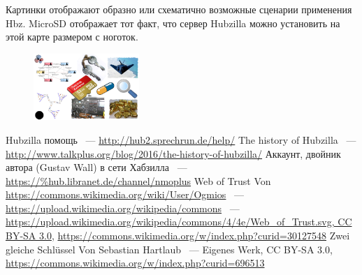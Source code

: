 \documentclass[10pt, a5paper]{article}
\begin{document}
Картинки отображают образно или схематично возможные сценарии применения Hbz. MicroSD отображает тот факт, что сервер Hubzilla можно установить на этой карте размером с ноготок.

\begin{center}
\begin{figure}[h!]
  \centering
  \includegraphics[width=4cm]{Wall2.png}
  
  \label{Wall2}
\end{figure}
\end{center} 

\begin{thebibliography}{20}
 Hubzilla помощь ~--- \url{http://hub2.sprechrun.de/help/}
 The history of Hubzilla ~--- \url{http://www.talkplus.org/blog/2016/the-history-of-hubzilla/}
 Аккаунт, двойник автора (Gustav Wall) в сети Хабзилла ~--- \url{https://\%hub.libranet.de/channel/nmoplus}
 Web of Trust Von \url{https://commons.wikimedia.org/wiki/User/Ogmios} ~--- \url{https://upload.wikimedia.org/wikipedia/commons} ~--- \url{https://upload.wikimedia.org/wikipedia/commons/4/4e/Web\_of\_Trust.svg, CC BY-SA 3.0}, \url{https://commons.wikimedia.org/w/index.php?curid=30127548}
 Zwei gleiche Schlüssel Von Sebastian Hartlaub ~--- Eigenes Werk, CC BY-SA 3.0, \url{https://commons.wikimedia.org/w/index.php?curid=696513}
\end{thebibliography} 
\end{document}
